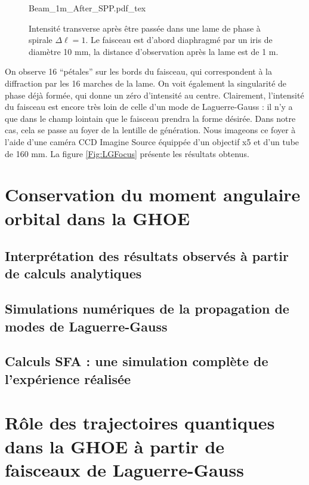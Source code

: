 \begin{figure}[!ht]
\centering
\def\svgwidth{0.4\columnwidth}
{Beam_1m_After_SPP.pdf_tex}
\caption{Intensité transverse après être passée dans une lame de phase à spirale $\Delta\ell = 1$. Le faisceau est d'abord diaphragmé par un iris de diamètre 10 mm, la distance d'observation après la lame est de 1 m.}
\label{Fig:BeamAfterSPP}
\end{figure}

On observe 16 ``pétales'' sur les bords du faisceau, qui correspondent à la diffraction par les 16 marches de la lame. On voit également la singularité de phase déjà formée, qui donne un zéro d'intensité au centre. Clairement, l'intensité du faisceau est encore très loin de celle d'un mode de Laguerre-Gauss : il n'y a que dans le champ lointain que le faisceau prendra la forme désirée. Dans notre cas, cela se passe au foyer de la lentille de génération. Nous imageons ce foyer à l'aide d'une caméra CCD Imagine Source équippée d'un objectif x5 et d'un tube de 160 mm. La figure \ref{Fig:LGFocus} présente les résultats obtenus.













\section{Conservation du moment angulaire orbital dans la GHOE}
\subsection{Interprétation des résultats observés à partir de calculs analytiques}
\subsection{Simulations numériques de la propagation de modes de Laguerre-Gauss}
\subsection{Calculs SFA : une simulation complète de l'expérience réalisée}

\section{Rôle des trajectoires quantiques dans la GHOE à partir de faisceaux de Laguerre-Gauss}
